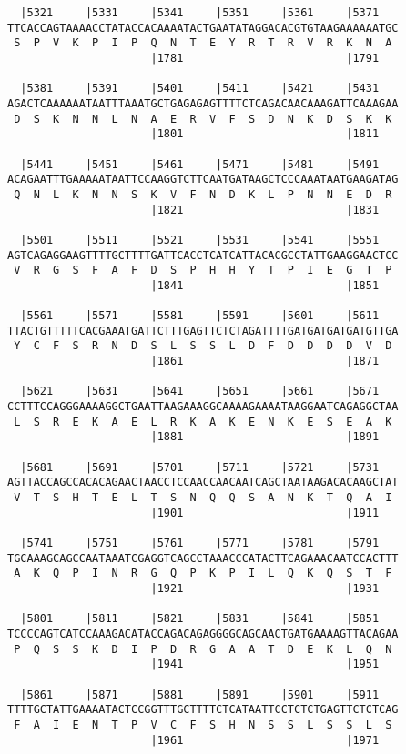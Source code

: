 \documentclass{article}
\begin{document}
\begin{Verbatim}
  |5321     |5331     |5341     |5351     |5361     |5371   
TTCACCAGTAAAACCTATACCACAAAATACTGAATATAGGACACGTGTAAGAAAAAATGC
 S  P  V  K  P  I  P  Q  N  T  E  Y  R  T  R  V  R  K  N  A 
                      |1781                         |1791   
  
  |5381     |5391     |5401     |5411     |5421     |5431   
AGACTCAAAAAATAATTTAAATGCTGAGAGAGTTTTCTCAGACAACAAAGATTCAAAGAA
 D  S  K  N  N  L  N  A  E  R  V  F  S  D  N  K  D  S  K  K 
                      |1801                         |1811   
  
  |5441     |5451     |5461     |5471     |5481     |5491   
ACAGAATTTGAAAAATAATTCCAAGGTCTTCAATGATAAGCTCCCAAATAATGAAGATAG
 Q  N  L  K  N  N  S  K  V  F  N  D  K  L  P  N  N  E  D  R 
                      |1821                         |1831   
  
  |5501     |5511     |5521     |5531     |5541     |5551   
AGTCAGAGGAAGTTTTGCTTTTGATTCACCTCATCATTACACGCCTATTGAAGGAACTCC
 V  R  G  S  F  A  F  D  S  P  H  H  Y  T  P  I  E  G  T  P 
                      |1841                         |1851   
  
  |5561     |5571     |5581     |5591     |5601     |5611   
TTACTGTTTTTCACGAAATGATTCTTTGAGTTCTCTAGATTTTGATGATGATGATGTTGA
 Y  C  F  S  R  N  D  S  L  S  S  L  D  F  D  D  D  D  V  D 
                      |1861                         |1871   
  
  |5621     |5631     |5641     |5651     |5661     |5671   
CCTTTCCAGGGAAAAGGCTGAATTAAGAAAGGCAAAAGAAAATAAGGAATCAGAGGCTAA
 L  S  R  E  K  A  E  L  R  K  A  K  E  N  K  E  S  E  A  K 
                      |1881                         |1891   
  
  |5681     |5691     |5701     |5711     |5721     |5731   
AGTTACCAGCCACACAGAACTAACCTCCAACCAACAATCAGCTAATAAGACACAAGCTAT
 V  T  S  H  T  E  L  T  S  N  Q  Q  S  A  N  K  T  Q  A  I 
                      |1901                         |1911   
  
  |5741     |5751     |5761     |5771     |5781     |5791   
TGCAAAGCAGCCAATAAATCGAGGTCAGCCTAAACCCATACTTCAGAAACAATCCACTTT
 A  K  Q  P  I  N  R  G  Q  P  K  P  I  L  Q  K  Q  S  T  F 
                      |1921                         |1931   
  
  |5801     |5811     |5821     |5831     |5841     |5851   
TCCCCAGTCATCCAAAGACATACCAGACAGAGGGGCAGCAACTGATGAAAAGTTACAGAA
 P  Q  S  S  K  D  I  P  D  R  G  A  A  T  D  E  K  L  Q  N 
                      |1941                         |1951   
  
  |5861     |5871     |5881     |5891     |5901     |5911   
TTTTGCTATTGAAAATACTCCGGTTTGCTTTTCTCATAATTCCTCTCTGAGTTCTCTCAG
 F  A  I  E  N  T  P  V  C  F  S  H  N  S  S  L  S  S  L  S 
                      |1961                         |1971   
  

\end{Verbatim}
\end{document}
